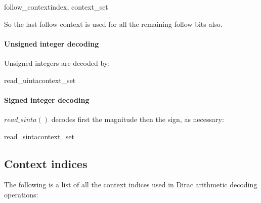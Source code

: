 \begin{pseudo}{follow\_context}{index, context\_set}
\end{pseudo}

So the last follow context is used for all the remaining follow bits also.

\paragraph{Unsigned integer decoding \\}

Unsigned integers are decoded by:

\begin{pseudo}{read\_uinta}{context\_set}
  \bsEND
\bsEND
{}
\end{pseudo}

\paragraph{Signed integer decoding \\}

$read\_sinta()$ decodes first the magnitude then the sign, as necessary:

\begin{pseudo}{read\_sinta}{context\_set}
  \bsEND
\bsEND
{}
\end{pseudo}

\subsection{Context indices}
\label{contextindices}

The following is a list of all the context indices used in Dirac arithmetic decoding operations:

